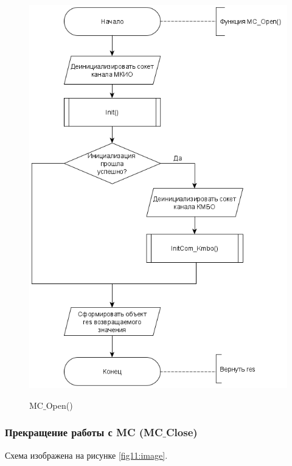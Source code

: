 	\begin{figure}[ph!]
		\centering
		\begin{center}
			{\includegraphics[scale=0.5]{schemes/mc_open.png}}
			\caption{MC$\_$Open()}
			\label{fig10:image}
		\end{center}
	\end{figure}

	\newpage

	\subsubsection{Прекращение работы с MC (MC$\_$Close)}
	
	Схема изображена на рисунке \ref{fig11:image}.
	
